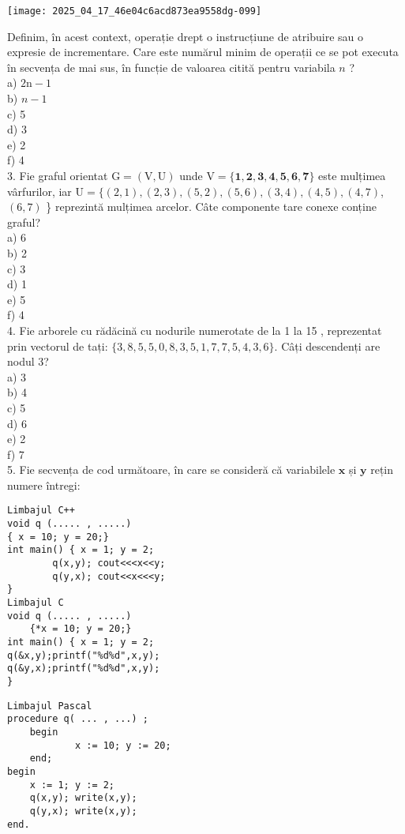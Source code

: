 \begin{center}
\texttt{[image: 2025\_04\_17\_46e04c6acd873ea9558dg-099]}
\end{center}

Definim, în acest context, operație drept o instrucțiune de atribuire sau o expresie de incrementare. Care este numărul minim de operații ce se pot executa în secvența de mai sus, în funcție de valoarea citită pentru variabila $n$ ?\\
a) $2 \mathrm{n}-1$\\
b) $n-1$\\
c) 5\\
d) 3\\
e) 2\\
f) 4\\
3. Fie graful orientat $\mathrm{G}=(\mathrm{V}, \mathrm{U})$ unde $\mathrm{V}=\{\mathbf{1}, \mathbf{2}, \mathbf{3}, \mathbf{4}, \mathbf{5}, \mathbf{6}, \mathbf{7}\}$ este mulțimea vârfurilor, iar $\mathrm{U}=\{(2,1),(2,3),(5,2),(5,6),(3,4),(4,5),(4,7)$, $(6,7)$ \} reprezintă mulțimea arcelor. Câte componente tare conexe conține graful?\\
a) 6\\
b) 2\\
c) 3\\
d) 1\\
e) 5\\
f) 4\\
4. Fie arborele cu rădăcină cu nodurile numerotate de la 1 la 15 , reprezentat prin vectorul de tați: $\{3,8,5,5,0,8,3,5,1,7,7,5,4,3,6\}$. Câți descendenți are nodul 3?\\
a) 3\\
b) 4\\
c) 5\\
d) 6\\
e) 2\\
f) 7\\
5. Fie secvența de cod următoare, în care se consideră că variabilele $\mathbf{x}$ și $\mathbf{y}$ rețin numere întregi:

\begin{verbatim}
Limbajul C++
void q (..... , .....)
{ x = 10; y = 20;}
int main() { x = 1; y = 2;
        q(x,y); cout<<<x<<y;
        q(y,x); cout<<x<<<y;
}
Limbajul C
void q (..... , .....)
    {*x = 10; y = 20;}
int main() { x = 1; y = 2;
q(&x,y);printf("%d%d",x,y);
q(&y,x);printf("%d%d",x,y);
}
\end{verbatim}

\begin{verbatim}
Limbajul Pascal
procedure q( ... , ...) ;
    begin
            x := 10; y := 20;
    end;
begin
    x := 1; y := 2;
    q(x,y); write(x,y);
    q(y,x); write(x,y);
end.
\end{verbatim}

